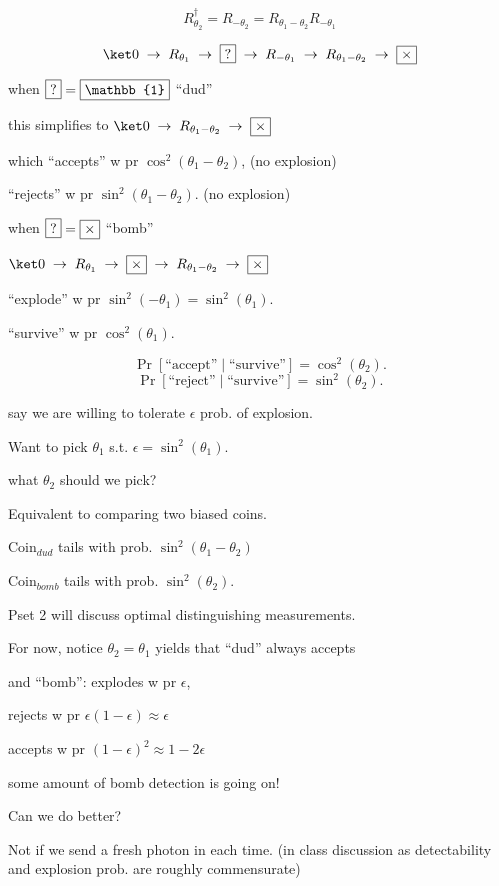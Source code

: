 \documentclass[11pt]{article}
\begin{document}
\[
R_{\theta_2}^\dagger = R_{-\theta_2} = R_{\theta_1-\theta_2}R_{-\theta_1}
\]

\[
\ket0 \;\to\; R_{\theta_1} \;\to\; \fbox{?} \;\to\; R_{-\theta_1} \;\to\; R_{\theta_1-\theta_2} \;\to\; \fbox{$\times$}
\]

when $\fbox{?} = \fbox{$\mathbb{1}$}$ ``dud''

this simplifies to $\ket0 \;\to\; R_{\theta_1-\theta_2} \;\to\; \fbox{$\times$}$

which ``accepts'' w pr $\cos^2(\theta_1-\theta_2)$, (no explosion)

``rejects'' w pr $\sin^2(\theta_1-\theta_2)$. (no explosion)

when $\fbox{?} = \fbox{$\times$}$ ``bomb''

$\ket0 \;\to\; R_{\theta_1} \;\to\; \fbox{$\times$} \;\to\; R_{\theta_1-\theta_2} \;\to\; \fbox{$\times$}$

``explode'' w pr $\sin^2(-\theta_1) = \sin^2(\theta_1)$.

``survive'' w pr $\cos^2(\theta_1)$.

\[
\Pr[\text{``accept''} \mid \text{``survive''}] = \cos^2(\theta_2).
\]
\[
\Pr[\text{``reject''} \mid \text{``survive''}] = \sin^2(\theta_2).
\]

say we are willing to tolerate $\epsilon$ prob. of explosion.

Want to pick $\theta_1$ s.t. $\epsilon = \sin^2(\theta_1)$.

what $\theta_2$ should we pick?

Equivalent to comparing two biased coins.

Coin$_{dud}$ tails with prob. $\sin^2(\theta_1-\theta_2)$

Coin$_{bomb}$ tails with prob. $\sin^2(\theta_2)$.

Pset 2 will discuss optimal distinguishing measurements.

For now, notice $\theta_2 = \theta_1$ yields that ``dud'' always accepts

and ``bomb'': explodes w pr $\epsilon$,

\hspace{2.3cm} rejects w pr $\epsilon(1-\epsilon)\approx\epsilon$

\hspace{2.3cm} accepts w pr $(1-\epsilon)^2 \approx 1-2\epsilon$

some amount of bomb detection is going on!

Can we do better?

Not if we send a fresh photon in each time. (in class discussion as detectability and explosion prob. are roughly commensurate)
\end{document}
